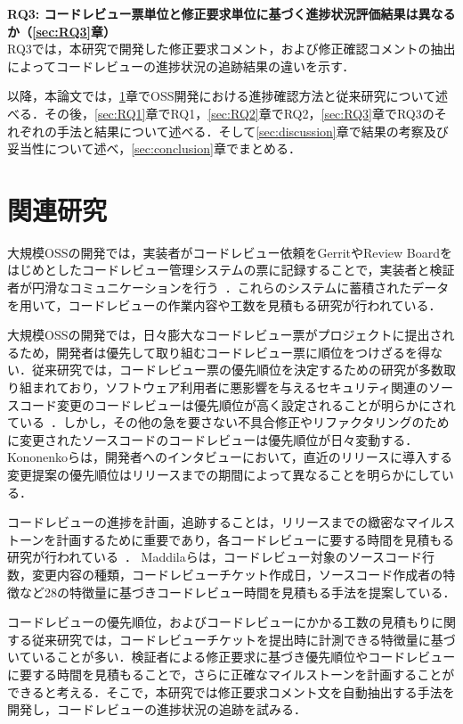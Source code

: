 \documentclass[submit,techrep,noauthor]{ipsj}
\newcommand{\RQThree}{コードレビュー票単位と修正要求単位に基づく進捗状況評価結果は異なるか}
\begin{document}
\noindent\textbf{RQ3: \RQThree（\ref{sec:RQ3}章）}\\
RQ3では，本研究で開発した修正要求コメント，および修正確認コメントの抽出によってコードレビューの進捗状況の追跡結果の違いを示す．

以降，本論文では，\ref{sec:progress}章でOSS開発における進捗確認方法と従来研究について述べる．その後，\ref{sec:RQ1}章でRQ1，\ref{sec:RQ2}章でRQ2，\ref{sec:RQ3}章でRQ3のそれぞれの手法と結果について述べる．そして\ref{sec:discussion}章で結果の考察及び妥当性について述べ，\ref{sec:conclusion}章でまとめる．

\section{関連研究}\label{sec:progress}

大規模OSSの開発では，実装者がコードレビュー依頼をGerritやReview Boardをはじめとしたコードレビュー管理システムの票に記録することで，実装者と検証者が円滑なコミュニケーションを行う~\cite{code_review}．これらのシステムに蓄積されたデータを用いて，コードレビューの作業内容や工数を見積もる研究が行われている．

大規模OSSの開発では，日々膨大なコードレビュー票がプロジェクトに提出されるため，開発者は優先して取り組むコードレビュー票に順位をつけざるを得ない．従来研究では，コードレビュー票の優先順位を決定するための研究が多数取り組まれており，ソフトウェア利用者に悪影響を与えるセキュリティ関連のソースコード変更のコードレビューは優先順位が高く設定されることが明らかにされている~\cite{integrator}\cite{review_prioritize_pineapple}．しかし，その他の急を要さない不具合修正やリファクタリングのために変更されたソースコードのコードレビューは優先順位が日々変動する．Kononenkoらは，開発者へのインタビューにおいて，直近のリリースに導入する変更提案の優先順位はリリースまでの期間によって異なることを明らかにしている\cite{release_merge}．

コードレビューの進捗を計画，追跡することは，リリースまでの緻密なマイルストーンを計画するために重要であり，各コードレビューに要する時間を見積もる研究が行われている~\cite{estimate_time1}\cite{estimate_time2}\cite{estimate_time3}\cite{estimate_time4}\cite{estimate_time5}．
Maddilaらは，コードレビュー対象のソースコード行数，変更内容の種類，コードレビューチケット作成日，ソースコード作成者の特徴など28の特徴量に基づきコードレビュー時間を見積もる手法を提案している\cite{estimate_time2}．

コードレビューの優先順位，およびコードレビューにかかる工数の見積もりに関する従来研究では，コードレビューチケットを提出時に計測できる特徴量に基づいていることが多い．検証者による修正要求に基づき優先順位やコードレビューに要する時間を見積もることで，さらに正確なマイルストーンを計画することができると考える．そこで，本研究では修正要求コメント文を自動抽出する手法を開発し，コードレビューの進捗状況の追跡を試みる．
\end{document}
